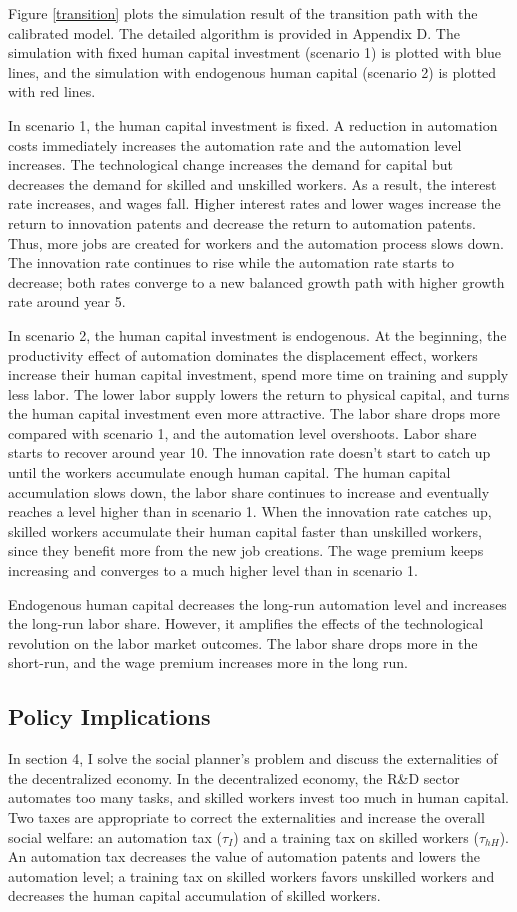 \documentclass[12pt]{article}
\begin{document}
Figure \ref{transition} plots the simulation result of the transition path with the calibrated model. The detailed algorithm is provided in Appendix D. The simulation with fixed human capital investment (scenario 1) is plotted with blue lines, and the simulation with endogenous human capital (scenario 2) is plotted with red lines. 

In scenario 1, the human capital investment is fixed. A reduction in automation costs immediately increases the automation rate and the automation level increases. The technological change increases the demand for capital but decreases the demand for skilled and unskilled workers. As a result, the interest rate increases, and wages fall. Higher interest rates and lower wages increase the return to innovation patents and decrease the return to automation patents. Thus, more jobs are created for workers and the automation process slows down. The innovation rate continues to rise while the automation rate starts to decrease; both rates converge to a new balanced growth path with higher growth rate around year 5. 

In scenario 2, the human capital investment is endogenous. At the beginning, the productivity effect of automation dominates the displacement effect, workers increase their human capital investment, spend more time on training and supply less labor. The lower labor supply lowers the return to physical capital, and turns the human capital investment even more attractive. The labor share drops more compared with scenario 1, and the automation level overshoots. Labor share starts to recover around year 10. The innovation rate doesn't start to catch up until the workers accumulate enough human capital. The human capital accumulation slows down, the labor share continues to increase and eventually reaches a level higher than in scenario 1. When the innovation rate catches up, skilled workers accumulate their human capital faster than unskilled workers, since they benefit more from the new job creations. The wage premium keeps increasing and converges to a much higher level than in scenario 1.

Endogenous human capital decreases the long-run automation level and increases the long-run labor share. However, it amplifies the effects of the technological revolution on the labor market outcomes. The labor share drops more in the short-run, and the wage premium increases more in the long run. 

\subsection{Policy Implications}
In section 4, I solve the social planner's problem and discuss the externalities of the decentralized economy. In the decentralized economy, the R\&D sector automates too many tasks, and skilled workers invest too much in human capital. Two taxes are appropriate to correct the externalities and increase the overall social welfare: an automation tax ($\tau_I$) and a training tax on skilled workers ($\tau_{hH}$). An automation tax decreases the value of automation patents and lowers the automation level; a training tax on skilled workers favors unskilled workers and decreases the human capital accumulation of skilled workers. 
\end{document}
